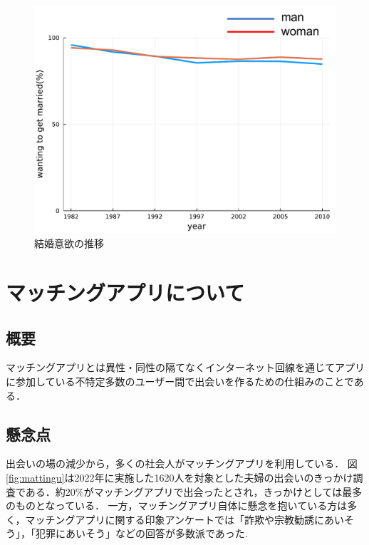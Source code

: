 \documentclass[12pt,a4j,titlepage]{ltjsarticle}
\begin{document}
\begin{figure}[h]
\begin{center}
\includegraphics[keepaspectratio, scale=0.7]{preview.pdf}
\end{center}
 \caption{結婚意欲の推移}
 \label{fig:iyoku}
\end{figure}

\clearpage

\section{マッチングアプリについて}
\subsection{概要}
マッチングアプリとは異性・同性の隔てなくインターネット回線を通じてアプリに参加している不特定多数のユーザー間で出会いを作るための仕組みのことである．
\subsection{懸念点}
出会いの場の減少から，多くの社会人がマッチングアプリを利用している．
図\ref{fig:mattingu}は2022年に実施した1620人を対象とした夫婦の出会いのきっかけ調査である．約20\%がマッチングアプリで出会ったとされ，きっかけとしては最多のものとなっている\cite{huuhuutyousa}．
一方，マッチングアプリ自体に懸念を抱いている方は多く，マッチングアプリに関する印象アンケートでは「詐欺や宗教勧誘にあいそう」，「犯罪にあいそう」などの回答が多数派であった\cite{prtimes}.
\end{document}
